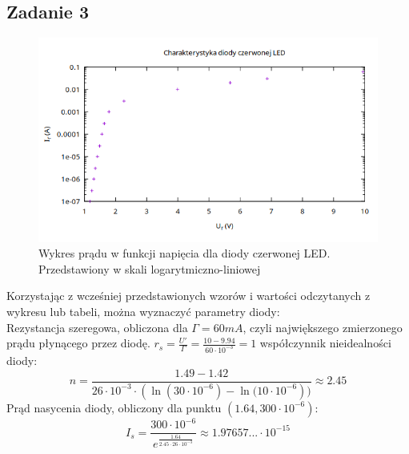 \documentclass{article}
\begin{document}
\subsection{Zadanie 3}
\centering
\begin{figure}[h]
  \includegraphics[scale=0.5]{./img/Z3_U.png}
  \caption{Wykres prądu w funkcji napięcia dla diody czerwonej LED. Przedstawiony w skali logarytmiczno-liniowej}
\end{figure}
Korzystając z wcześniej przedstawionych wzorów i wartości odczytanych z wykresu lub tabeli, można wyznaczyć parametry diody: \\
Rezystancja szeregowa, obliczona dla $\Gamma=60mA$, czyli największego zmierzonego prądu płynącego przez diodę.  $r_s=\frac{U'}{\Gamma} = \frac{10-9.94}{60 \cdot 10^{-3}}=1$
współczynnik nieidealności diody: \[n = \frac{1.49-1.42}
{26 \cdot 10^{-3} \cdot (\ln{(30 \cdot 10^{-6})}-\ln{(10 \cdot 10^{-6}}))} \approx 2.45\]
Prąd nasycenia diody, obliczony dla punktu $(1.64,300\cdot10^{-6})$: \[I_s=\frac{300 \cdot 10^{-6}}{e^{\frac{1.64}{2.45 \cdot 26 \cdot 10^{-3}}}} \approx 1.97657... \cdot 10^{-15}\]

\break
\raggedright
\end{document}
